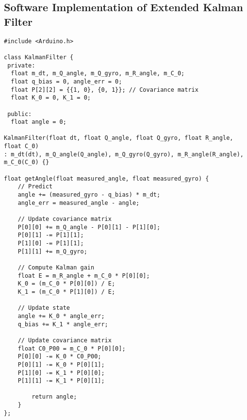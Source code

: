 \subsection{Software Implementation of Extended Kalman Filter}
\begin{lstlisting}[style=cppstyle2]
#include <Arduino.h>

class KalmanFilter {
 private:
  float m_dt, m_Q_angle, m_Q_gyro, m_R_angle, m_C_0;
  float q_bias = 0, angle_err = 0;
  float P[2][2] = {{1, 0}, {0, 1}}; // Covariance matrix
  float K_0 = 0, K_1 = 0;

 public:
  float angle = 0;

KalmanFilter(float dt, float Q_angle, float Q_gyro, float R_angle, float C_0)
: m_dt(dt), m_Q_angle(Q_angle), m_Q_gyro(Q_gyro), m_R_angle(R_angle), m_C_0(C_0) {}

float getAngle(float measured_angle, float measured_gyro) {
	// Predict
	angle += (measured_gyro - q_bias) * m_dt;
	angle_err = measured_angle - angle;
	
	// Update covariance matrix
	P[0][0] += m_Q_angle - P[0][1] - P[1][0];
	P[0][1] -= P[1][1];
	P[1][0] -= P[1][1];
	P[1][1] += m_Q_gyro;
	
	// Compute Kalman gain
	float E = m_R_angle + m_C_0 * P[0][0];
	K_0 = (m_C_0 * P[0][0]) / E;
	K_1 = (m_C_0 * P[1][0]) / E;
	
	// Update state
	angle += K_0 * angle_err;
	q_bias += K_1 * angle_err;
	
	// Update covariance matrix
	float C0_P00 = m_C_0 * P[0][0];
	P[0][0] -= K_0 * C0_P00;
	P[0][1] -= K_0 * P[0][1];
	P[1][0] -= K_1 * P[0][0];
	P[1][1] -= K_1 * P[0][1];
	
		return angle;
	}
};
\end{lstlisting}
